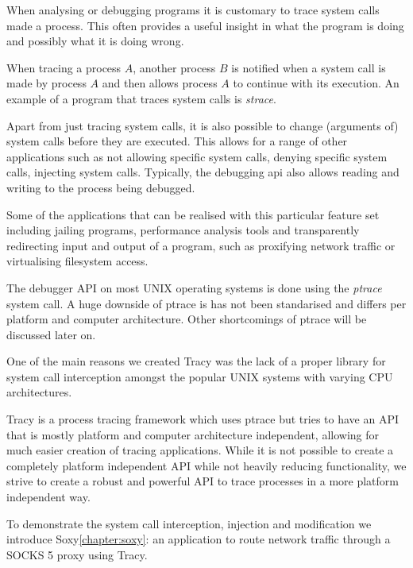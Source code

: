 \documentclass[a4paper, twoside, 10pt, twocolumn]{report}
\begin{document}
When analysing or debugging programs it is customary to trace system calls made
a process. This often provides a useful insight in what the program is doing and
possibly what it is doing wrong.

When tracing a process $A$, another process $B$ is notified when a system call
is made by process $A$  and then allows process $A$ to continue with its
execution. An example of a program that traces system calls is
\textit{strace}\cite{strace}.

Apart from just tracing system calls, it is also possible to change
(arguments of) system calls before they are executed. This allows for a range
of other applications such as not allowing specific system calls, denying
specific system calls, injecting system calls. Typically, the debugging api also
allows reading and writing to the process being debugged.

Some of the applications that can be realised with this particular feature set
including jailing programs, performance analysis tools and transparently
redirecting input and output of a program, such as proxifying network
traffic or virtualising filesystem access.

The debugger API on most UNIX operating systems is done using the
\textit{ptrace} system call. A huge downside of ptrace is has not been
standarised and differs per platform and computer architecture. Other
shortcomings of ptrace will be discussed later on.

One of the main reasons we created Tracy was the lack of a proper library
for system call interception amongst the popular UNIX systems with
varying CPU architectures.

Tracy is a process tracing framework which uses ptrace but tries to have an API
that is mostly platform and computer architecture independent, allowing for much
easier creation of tracing applications. While it is not possible to create a
completely platform independent API while not heavily reducing functionality, we
strive to create a robust and powerful API to trace processes in a more platform
independent way.

To demonstrate the system call interception, injection and modification
we introduce Soxy\ref{chapter:soxy}: an application to route network
traffic through a SOCKS 5 proxy using Tracy.

%
\end{document}
